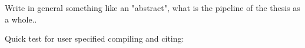 

Write in general something like an "abstract", what is the pipeline of the thesis as a whole..

Quick test for user specified compiling and citing:\\
\cite{lutkepohl1996specification}